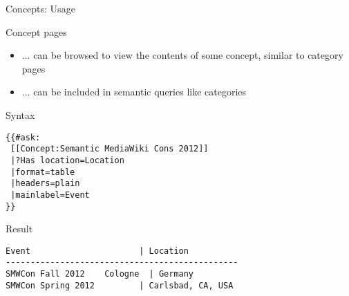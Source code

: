 \documentclass[aspectratio=1610,onlymath]{beamer}
\begin{document}
\begin{frame}[fragile]{Concepts: Usage}

Concept pages 
\begin{itemize}
	\item[] ... can be \alert{browsed} to view the contents of some concept, similar to category pages
 	\item[] ... can be included in \alert{semantic queries} like categories
\end{itemize}

\bigskip
\alert{Syntax}
\begin{lstlisting}
{{#ask:
 [[Concept:Semantic MediaWiki Cons 2012]]
 |?Has location=Location
 |format=table
 |headers=plain
 |mainlabel=Event
}}
\end{lstlisting}

\alert{Result}
\begin{lstlisting}
Event                      | Location
-----------------------------------------------
SMWCon Fall 2012	Cologne  | Germany
SMWCon Spring 2012         | Carlsbad, CA, USA
\end{lstlisting}


\end{frame}






%
%
\end{document}
